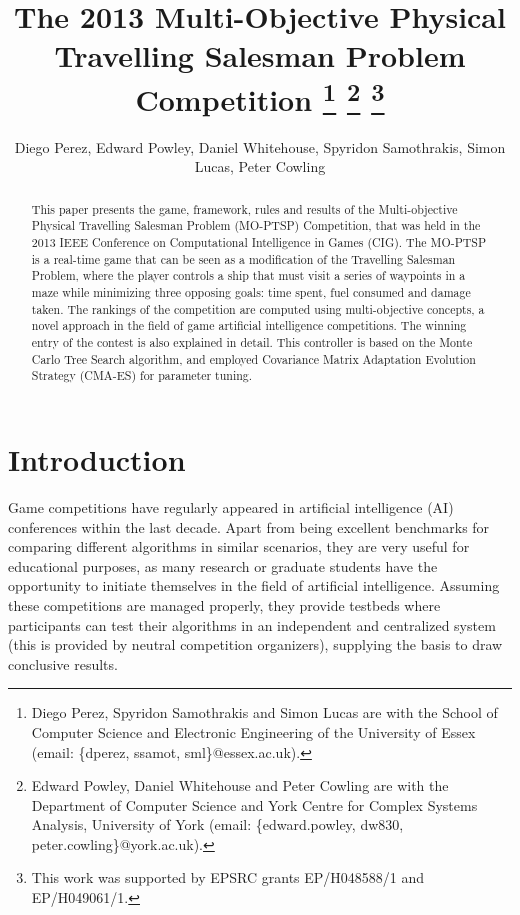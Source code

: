 \documentclass[conference]{IEEEtran}
\begin{document}
\title{The 2013 Multi-Objective Physical Travelling Salesman Problem Competition \thanks{Diego Perez, Spyridon Samothrakis and Simon Lucas are with the School of Computer Science and Electronic Engineering of the University of Essex (email: \{dperez, ssamot, sml\}@essex.ac.uk).} \thanks{Edward Powley, Daniel Whitehouse and Peter Cowling are with the Department of Computer Science and York Centre for Complex Systems Analysis, University of York (email:  \{\mbox{edward.powley}, \mbox{dw830}, \mbox{peter.cowling}\}@york.ac.uk).} \thanks{This work was supported by EPSRC grants EP/H048588/1 and EP/H049061/1.}}

\author{Diego Perez, Edward Powley, Daniel Whitehouse, Spyridon Samothrakis, Simon Lucas, Peter Cowling}


\maketitle

\begin{abstract}
This paper presents the game, framework, rules and results of the Multi-objective Physical Travelling Salesman Problem (MO-PTSP) Competition, that was held in the 2013 IEEE Conference on Computational Intelligence in Games (CIG). The MO-PTSP is a real-time game that can be seen as a modification of the Travelling Salesman Problem, where the player controls a ship that must visit a series of waypoints in a maze while minimizing three opposing goals: time spent, fuel consumed and damage taken. The rankings of the competition are computed using multi-objective concepts, a novel approach in the field of game artificial intelligence competitions. The winning entry of the contest is also explained in detail. This controller is based on the Monte Carlo Tree Search algorithm, and employed Covariance Matrix Adaptation Evolution Strategy (CMA-ES) for parameter tuning. 
\end{abstract}


\section{Introduction}

Game competitions have regularly appeared in artificial intelligence (AI) conferences within the last decade. Apart from being excellent benchmarks for comparing different algorithms in similar scenarios, they are very useful for educational purposes, as many research or graduate students have the opportunity to initiate themselves in the field of artificial intelligence. Assuming these competitions are managed properly, they provide testbeds where participants can test their algorithms in an independent and centralized system (this is provided by neutral competition organizers), supplying the basis to draw conclusive results.
\end{document}
